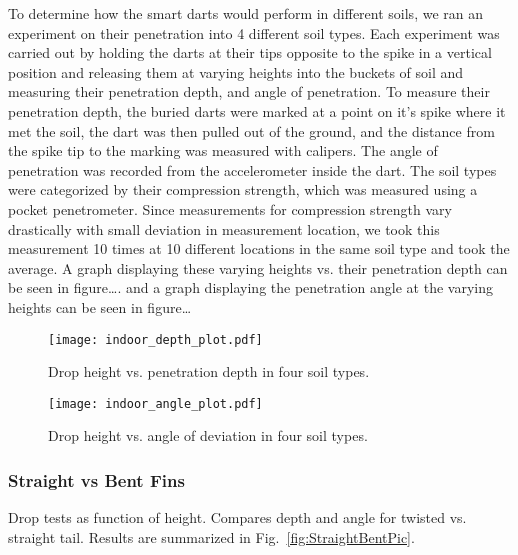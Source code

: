 To determine how the smart darts would perform in different soils, we ran an experiment on their penetration into 4 different soil types. Each experiment was carried out by holding the darts at their tips opposite to the spike in a vertical position and releasing them at varying heights into the buckets of soil and measuring their penetration depth, and angle of penetration. To measure their penetration depth, the buried darts were marked at a point on it’s spike where it met the soil, the dart was then pulled out of the ground, and the distance from the spike tip to the marking was measured with calipers. The angle of penetration was recorded from the accelerometer inside the dart. The soil types were categorized by their compression strength, which was measured using a pocket penetrometer. Since measurements for compression strength vary drastically with small deviation in measurement location, we took this measurement 10 times at 10 different locations in the same soil type and took the average. A graph displaying these varying heights vs. their penetration depth can be seen in figure…. and a graph displaying the penetration angle at the varying heights can be seen in figure…

\begin{figure} \centering
{\texttt{[image: indoor\_depth\_plot.pdf]}}
\caption{Drop height vs. penetration depth in four soil types.} 
\label{fig:DepthPlotIndoors}
\end{figure}

\begin{figure} \centering
{\texttt{[image: indoor\_angle\_plot.pdf]}}
\caption{Drop height vs. angle of deviation in four soil types.} 
\label{fig:AnglePlotIndoors}
\vspace{-1em}
\end{figure}

\subsubsection{Straight vs Bent Fins}

Drop tests as function of height. Compares depth and angle for twisted vs. straight tail.
Results are summarized in Fig.~\ref{fig:StraightBentPic}.

